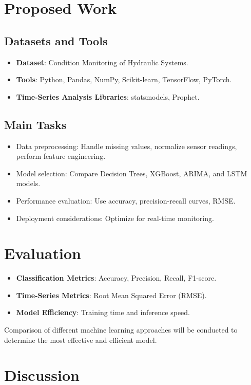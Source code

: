 \documentclass[sigconf]{acmart}
\begin{document}
\section{Proposed Work}
\subsection{Datasets and Tools}
\begin{itemize}
    \item \textbf{Dataset}: Condition Monitoring of Hydraulic Systems.
    \item \textbf{Tools}: Python, Pandas, NumPy, Scikit-learn, TensorFlow, PyTorch.
    \item \textbf{Time-Series Analysis Libraries}: statsmodels, Prophet.
\end{itemize}

\subsection{Main Tasks}
\begin{itemize}
    \item Data preprocessing: Handle missing values, normalize sensor readings, perform feature engineering.
    \item Model selection: Compare Decision Trees, XGBoost, ARIMA, and LSTM models.
    \item Performance evaluation: Use accuracy, precision-recall curves, RMSE.
    \item Deployment considerations: Optimize for real-time monitoring.
\end{itemize}

\section{Evaluation}
\begin{itemize}
    \item \textbf{Classification Metrics}: Accuracy, Precision, Recall, F1-score.
    \item \textbf{Time-Series Metrics}: Root Mean Squared Error (RMSE).
    \item \textbf{Model Efficiency}: Training time and inference speed.
\end{itemize}
Comparison of different machine learning approaches will be conducted to determine the most effective and efficient model.

\section{Discussion}
\end{document}
